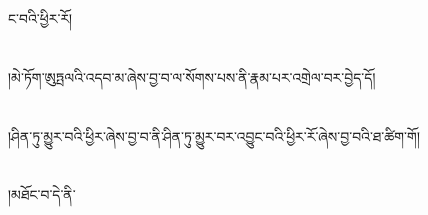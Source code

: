 ང་བའི་ཕྱིར་རོ།\chapter{ }།མེ་ཏོག་ཨུཏྤལའི་འདབ་མ་ཞེས་བྱ་བ་ལ་སོགས་པས་ནི་རྣམ་པར་འགྲེལ་བར་བྱེད་དོ།\chapter{ }།ཤིན་ཏུ་མྱུར་བའི་ཕྱིར་ཞེས་བྱ་བ་ནི་ཤིན་ཏུ་མྱུར་བར་འབྱུང་བའི་ཕྱིར་རོ་ཞེས་བྱ་བའི་ཐ་ཚིག་གོ།\chapter{ }།མཐོང་བ་དེ་ནི་